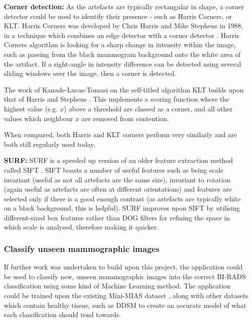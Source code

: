 \noindent \textbf{Corner detection: } As the artefacts are typically rectangular in shape, a corner detector could be used to identify their presence - such as Harris Corners, or KLT. Harris Corners was developed by Chris Harris and Mike Stephens in 1988, in a technique which combines an edge detector with a corner detector \cite{Harris_Stephens_1988}. Harris Corners algorithm is looking for a sharp change in intensity within the image, such as passing from the black mammogram background onto the white area of the artifact. If a right-angle in intensity difference can be detected using several sliding windows over the image, then a corner is detected.

The work of Kanade-Lucas-Tomasi on the self-titled algorithm \acrshort{KLT} builds upon that of Harris and Stephens \cite{Shi_Tomasi_1994} \cite{tomasi2004detection}. This implements a scoring function where the highest value (e.g. $x$) above a threshold are classed as a corner, and all other values which neighbour $x$ are removed from contention.

When compared, both Harris and KLT corners perform very similarly and are both still regularly used today.

\noindent \textbf{SURF: } \acrfull{SURF} \cite{Bay_Tuytelaars_Gool_2006} is a speeded up version of an older feature extraction method called \acrfull{SIFT} \cite{Lowe_1999}. \acrshort{SIFT} boasts a number of useful features such as being scale invariant (useful as not all artefacts are the same size), invariant to rotation (again useful as artefacts are often at different orientations) and features are selected only if there is a good enough contrast (as artefacts are typically white on a black background, this is helpful). \acrshort{SURF} improves upon \acrshort{SIFT} by utilising different-sized box features rather than \acrfull{DOG} filters for refining the space in which scale is analysed, therefore making it quicker.

\subsubsection{Classify unseen mammographic images}

If further work was undertaken to build upon this project, the application could be used to classify new, unseen mammographic images into the correct BI-RADS classification using some kind of Machine Learning method. The application could be trained upon the existing Mini-MIAS dataset \cite{Suckling_1994}, along with other datasets which contain healthy tissue, such as \acrshort{DDSM} \cite{Heath_Bowyer_Kopans_Moore_Kegelmeyer_Processing} \cite{Heath_Bowyer_Kopans_Kegelmeyer_Moore_Chang_MunishKumaran_1998} to create an accurate model of what each classification should tend towards.

